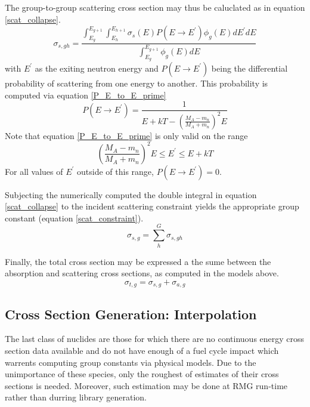 The group-to-group scattering cross section may thus be caluclated as in equation \ref{scat_collapse}.
\begin{equation}
\label{scat_collapse}
\sigma_{s,gh} = \frac{\int_{E_g}^{E_{g+1}} \int_{E_h}^{E_{h+1}} \sigma_s(E) P(E \to E^\prime) \phi_g(E) dE^\prime dE}
                     {\int_{E_g}^{E_{g+1}} \phi_g(E) dE}
\end{equation}
with $E^\prime$ as the exiting neutron energy and $P(E \to E^\prime)$ being the differential probability of 
scattering from one energy to another.  This probability is computed via equation \ref{P_E_to_E_prime}
\begin{equation}
\label{P_E_to_E_prime}
P(E \to E^\prime) = \frac{1}{E + kT - \left(\frac{M_A - m_n}{M_A + m_n}\right)^2 E}
\end{equation}
Note that equation \ref{P_E_to_E_prime} is only valid on the range 
\begin{equation}
\label{P_E_to_E_prime_range}
\left(\frac{M_A - m_n}{M_A + m_n}\right)^2 E \le E^\prime \le E + kT
\end{equation}
For all values of $E^\prime$ outside of this range, $P(E \to E^\prime) = 0$.

Subjecting the numerically computed the double integral in equation \ref{scat_collapse} 
to the incident scattering constraint yields the appropriate group constant (equation \ref{scat_constraint}).
\begin{equation}
\label{scat_constraint}
\sigma_{s,g} = \sum_h^G \sigma_{s,gh}
\end{equation}

Finally, the total cross section may be expressed a the sume between the absorption and scattering
cross sections, as computed in the models above.
\begin{equation}
\label{tot_xs_model}
\sigma_{t,g} = \sigma_{s,g} + \sigma_{a,g}
\end{equation}

\subsection{Cross Section Generation: Interpolation}
The last class of nuclides are those for which there are no continuous energy cross section data 
available and do not have enough of a fuel cycle impact which warrents computing group constants 
via physical models.  Due to the unimportance of these species, only the roughest of estimates
of their cross sections is needed.  Moreover, such estimation may be done at RMG run-time rather 
than durring library generation.

